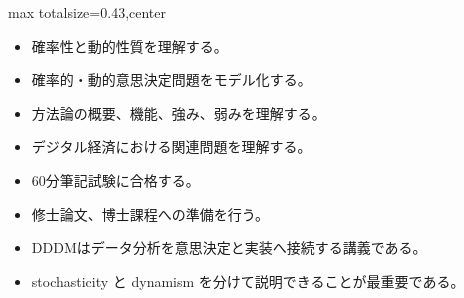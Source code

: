 \clearpage
{}
\begin{minipage}[t]{0.405\textwidth}
\begin{adjustbox}{max totalsize={\textwidth}{0.43\textheight},center}
\begin{minipage}{\textwidth}\scriptsize
{}\begin{itemize}
\item 確率性と動的性質を理解する。
\item 確率的・動的意思決定問題をモデル化する。
\item 方法論の概要、機能、強み、弱みを理解する。
\item デジタル経済における関連問題を理解する。
\item 60分筆記試験に合格する。
\item 修士論文、博士課程への準備を行う。
\end{itemize}\begin{itemize}
\item DDDMはデータ分析を意思決定と実装へ接続する講義である。
\item stochasticity と dynamism を分けて説明できることが最重要である。
\end{itemize}
\end{minipage}
\end{adjustbox}
\end{minipage}\hfill
